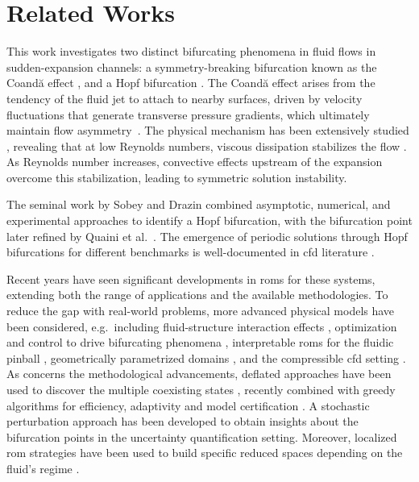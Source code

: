\section{Related Works}
\label{sec:related}

This work investigates two distinct bifurcating phenomena in fluid flows in sudden-expansion channels: a symmetry-breaking bifurcation known as the Coandă effect \parencite{PichiDrivingBifurcatingParametrized2022a,Khamlich_2022,Pitton_2017}, and a Hopf bifurcation \parencite{QUAINI,Fortin_localization}. %
%
%
The Coandă effect arises from the tendency of the fluid jet to attach to nearby surfaces, driven by velocity fluctuations that generate transverse pressure gradients, which ultimately maintain flow asymmetry~\parencite{tritton1977physical, wille1965coanda}. The physical mechanism has been extensively studied \parencite{Cherdron_Durst_Whitelaw_1978, Sobey_Drazin_1986}, revealing that at low Reynolds numbers, viscous dissipation stabilizes the flow \parencite{HAWA_RUSAK_2001}. As Reynolds number increases, convective effects upstream of the expansion overcome this stabilization, leading to symmetric solution instability.

The seminal work by Sobey and Drazin \parencite{Sobey_Drazin_1986} combined asymptotic, numerical, and experimental approaches to identify a Hopf bifurcation, with the bifurcation point later refined by Quaini et al.\ \parencite{QUAINI}. The emergence of periodic solutions through Hopf bifurcations for different benchmarks is well-documented in \gls{cfd} literature \parencite{Sobey_Drazin_1986, Fortin_localization, ArioliKoch2021, Dušek_Gal_Fraunié_1994}.

%

Recent years have seen significant developments in \glspl{rom} for these systems, extending both the range of applications and the available methodologies. To reduce the gap with real-world problems, more advanced physical models have been considered, e.g.\ including fluid-structure interaction effects \parencite{Khamlich_2022}, optimization and control to drive bifurcating phenomena \parencite{PichiDrivingBifurcatingParametrized2022a,Boull2023}, interpretable \glspl{rom} for the fluidic pinball \parencite{Pastur_2019}, geometrically parametrized domains \cite{PICHI2023105813,Bravo_2024}, and the compressible \gls{cfd} setting \parencite{Tonicello_2024}. As concerns the methodological advancements,  deflated approaches have been used to discover the multiple coexisting states \parencite{pintore_2021}, recently combined with greedy algorithms for efficiency, adaptivity and model certification \parencite{pichi2025deflationbasedcertifiedgreedyalgorithm}. A stochastic perturbation approach \parencite{gonnella2025stochasticperturbationapproachnonlinear} has been developed to obtain insights about the bifurcation points in the uncertainty quantification setting. Moreover, localized \gls{rom} strategies have been used to build specific reduced spaces depending on the fluid's regime \parencite{Hess_2019}.

